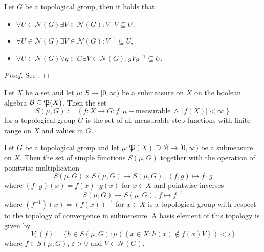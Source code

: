 \begin{lemma}
  Let $G$ be a topological group, then it holds that
  \vspace*{-7px}
  \begin{itemize}
    \item $\forall U\in \mathcal{N}(G)\exists V\in\mathcal{N}(G)\colon V\cdot V \subseteq U$,
  \vspace*{-7px}
    \item $\forall U\in \mathcal{N}(G)\exists V\in\mathcal{N}(G)\colon V^{-1} \subseteq U$,
  \vspace*{-7px}
    \item $\forall U\in \mathcal{N}(G)\forall g\in G\exists V\in\mathcal{N}(G)\colon gVg^{-1} \subseteq U$.
  \end{itemize}
\end{lemma}

\begin{proof}
  See \cite[Satz 16.16]{BvQMT}.
\end{proof}

\begin{defin}\label{defin:sf}
  Let $X$ be a set and let $\mu\colon \mathcal{B} \to [0, \infty)$ be a submeasure on $X$ on the boolean algebra $\mathcal{B} \subseteq \mathfrak{P}(X)$. Then the set
  \begin{equation*}
    S(\mu, G) := \left\{ f: X \to G\colon f \:\:\mu-\text{measurable} \: \land \: \left| f(X) \right| < \infty \right\}
  \end{equation*}
  for a topological group $G$ is the set of all measurable step functions with finite range on $X$ and values in $G$.
\end{defin}

\begin{thm}\label{thm:stop}
  Let $G$ be a topological group and let $\mu\colon \mathfrak{P}(X) \supseteq \mathcal{B} \to [0,\infty)$ be a submeasure on $X$. Then the set of simple functions $S(\mu, G)$ together with the operation of pointwise multiplication \[S(\mu, G) \times S(\mu, G) \to S(\mu, G), \: (f, g) \mapsto f \cdot g\] where $(f \cdot g)(x) = f(x) \cdot g(x)$ for $x \in X$ and pointwise inverses \[S(\mu, G) \to S(\mu, G), \: f \mapsto f^{-1}\] where $(f^{-1})(x) = (f(x))^{-1}$ for $x \in X$ is a topological group with respect to the topology of convergence in submeasure. A basis element of this topology is given by \[V_\varepsilon(f) = \{h\in S(\mu, G)\colon \mu(\left\{x\in X\colon h(x)\notin f(x)V \right\}) < \varepsilon\} \] where $f\in S(\mu, G)$, $\varepsilon > 0$ and $V \in \mathcal{N}(G)$.
\end{thm}

